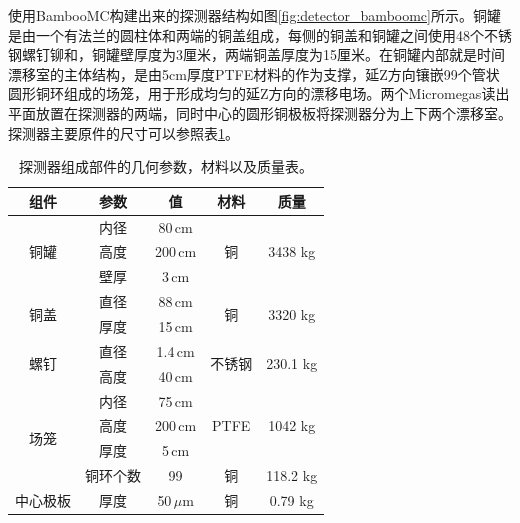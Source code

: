 使用BambooMC构建出来的探测器结构如图\ref{fig:detector_bamboomc}所示。铜罐是由一个有法兰的圆柱体和两端的铜盖组成，每侧的铜盖和铜罐之间使用48个不锈钢螺钉铆和，铜罐壁厚度为3厘米，两端铜盖厚度为15厘米。在铜罐内部就是时间漂移室的主体结构，是由5cm厚度PTFE材料的作为支撑，延Z方向镶嵌99个管状圆形铜环组成的场笼，用于形成均匀的延Z方向的漂移电场。两个Micromegas读出平面放置在探测器的两端，同时中心的圆形铜极板将探测器分为上下两个漂移室。探测器主要原件的尺寸可以参照表\ref{tab:parameters_geometry}。
\begin{table}[thb]
    \begin{center}
        \begin{tabular*}{0.75\textwidth}{@{\extracolsep{\fill}}ccccc}
        \hline
        \hline
        \textbf{组件} & \textbf{参数} & \textbf{值} & \textbf{材料} & \textbf{质量} \\ \hline
        \multirow{3}{*}{铜罐} 
            & 内径 & 80\,cm & \multirow{3}{*}{铜} & \multirow{3}{*}{3438 kg} \\
            & 高度 & 200\,cm &  &    \\   
            & 壁厚 & 3\,cm &  &    \\\hline
        \multirow{2}{*}{铜盖} 
            & 直径 & 88\,cm & \multirow{2}{*}{铜} & \multirow{2}{*}{3320 kg} \\
            & 厚度 & 15\,cm &  &    \\\hline
        \multirow{2}{*}{螺钉} 
            & 直径 & 1.4\,cm & \multirow{2}{*}{不锈钢} & \multirow{2}{*}{230.1 kg} \\
            & 高度 & 40\,cm &  &    \\\hline
        \multirow{4}{*}{场笼} 
            & 内径 & 75\,cm & \multirow{3}{*}{PTFE} & \multirow{3}{*}{1042 kg} \\
            & 高度 & 200\,cm &  & \\ 
            & 厚度 & 5\,cm &  & \\ 
            & 铜环个数 & 99 &    \multirow{1}{*}{铜}  & 118.2 kg \\\hline
        中心极板 
            & 厚度   &   50\,$\mu$m     &   \multirow{1}{*}{铜}  &    0.79 kg   \\   
        \hline
        \hline
        \end{tabular*}
        \caption{探测器组成部件的几何参数，材料以及质量表。\supercite{cdr}}
        \label{tab:parameters_geometry}
    \end{center}
\end{table}
  
